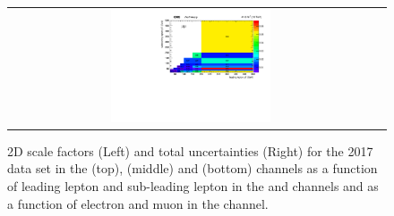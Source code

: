 \begin{figure}[!htb]
\begin{center}
\begin{tabular}{cc}
      \includegraphics[width=0.45\textwidth]{fig_2017_TrigSF/h2D_lepABpt_mumu_BinErrors.pdf}\\
    \end{tabular}
    \caption{2D scale factors (Left) and total uncertainties (Right) for the 2017 data set in the \emu (top), \ee (middle) and \mumu (bottom) channels as a function of leading lepton \pT and sub-leading lepton \pT in the \ee and \mumu channels and as a function of electron \pT and muon \pT in the \emu channel.}
    \label{TrigSF_2017_4}
  \end{center}
\end{figure}

